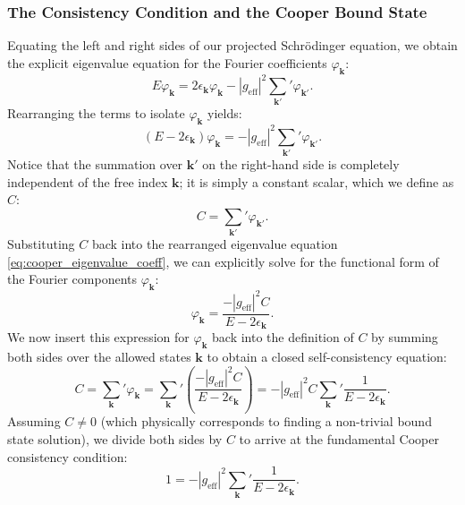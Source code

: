 \subsubsection{The Consistency Condition and the Cooper Bound State}

Equating the left and right sides of our projected Schrödinger equation, we obtain the explicit eigenvalue equation for the Fourier coefficients \( \varphi_{\mathbf{k}} \):
\[
    E \varphi_{\mathbf{k}} = 2\epsilon_{\mathbf{k}} \varphi_{\mathbf{k}} - |g_{\text{eff}}|^2 \sum_{\mathbf{k}'}' \varphi_{\mathbf{k}'}.
\]
Rearranging the terms to isolate \( \varphi_{\mathbf{k}} \) yields:
\begin{equation} \label{eq:cooper_eigenvalue_coeff}
    (E - 2\epsilon_{\mathbf{k}}) \varphi_{\mathbf{k}} = -|g_{\text{eff}}|^2 \sum_{\mathbf{k}'}' \varphi_{\mathbf{k}'}.
\end{equation}
Notice that the summation over \( \mathbf{k}' \) on the right-hand side is completely independent of the free index \( \mathbf{k} \); it is simply a constant scalar, which we define as \( C \):
\[
    C = \sum_{\mathbf{k}'}' \varphi_{\mathbf{k}'}.
\]
Substituting \( C \) back into the rearranged eigenvalue equation \eqref{eq:cooper_eigenvalue_coeff}, we can explicitly solve for the functional form of the Fourier components \( \varphi_{\mathbf{k}} \):
\[
    \varphi_{\mathbf{k}} = \frac{-|g_{\text{eff}}|^2 C}{E - 2\epsilon_{\mathbf{k}}}.
\]
We now insert this expression for \( \varphi_{\mathbf{k}} \) back into the definition of \( C \) by summing both sides over the allowed states \( \mathbf{k} \) to obtain a closed self-consistency equation:
\[
    C = \sum_{\mathbf{k}}' \varphi_{\mathbf{k}} = \sum_{\mathbf{k}}' \left( \frac{-|g_{\text{eff}}|^2 C}{E - 2\epsilon_{\mathbf{k}}} \right) = -|g_{\text{eff}}|^2 C \sum_{\mathbf{k}}' \frac{1}{E - 2\epsilon_{\mathbf{k}}}.
\]
Assuming \( C \neq 0 \) (which physically corresponds to finding a non-trivial bound state solution), we divide both sides by \( C \) to arrive at the fundamental Cooper consistency condition:
\begin{equation} \label{eq:cooper_discrete_sum}
    1 = -|g_{\text{eff}}|^2 \sum_{\mathbf{k}}' \frac{1}{E - 2\epsilon_{\mathbf{k}}}.
\end{equation}


